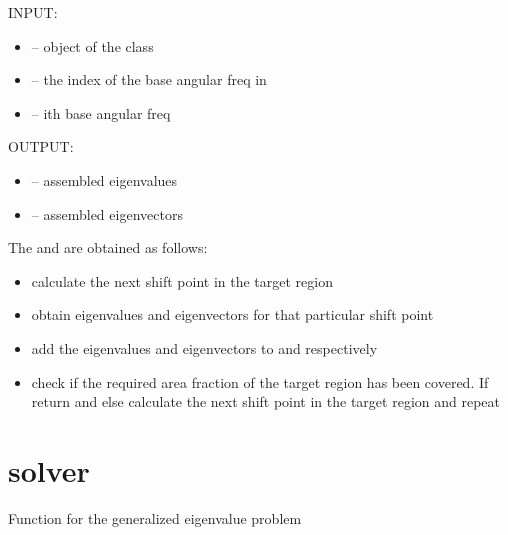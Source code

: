 \documentclass[letterpaper,10pt,english]{sphinxmanual}
\begin{document}
\begin{fulllineitems}
\label{index:qevp.brake_squeal_qevp}
INPUT:
\begin{itemize}
\item {} 
 -- object of the class 

\item {} 
 -- the index of the base angular freq in

\item {} 
 -- ith base angular freq

\end{itemize}

OUTPUT:
\begin{itemize}
\item {} 
 -- assembled eigenvalues

\item {} 
 -- assembled eigenvectors

\end{itemize}

The  and  are obtained as follows:
\begin{itemize}
\item {} 
calculate the next shift point in the target region

\item {} 
obtain eigenvalues and eigenvectors for that particular shift point

\item {} 
add the eigenvalues and eigenvectors to  and  respectively

\item {} 
check if the required area fraction of the target region has been covered. If  return
 and  else calculate the next shift point in the target
region and repeat

\end{itemize}

\end{fulllineitems}



\section{solver}
\label{index:module-solver}\label{index:solver}
Function for the generalized eigenvalue problem
\end{document}
